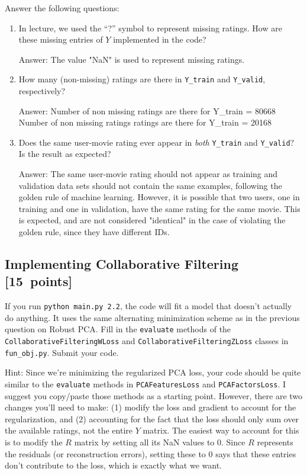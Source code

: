 \documentclass{article}
\newcommand{\blu}[1]{{\textcolor{blu}{#1}}}
\newcommand{\gre}[1]{\textcolor{gre}{#1}}
\newcommand\ans[1]{\par\gre{Answer: #1}}
\let\ask\blu
\newcommand\pts[1]{\textcolor{pointscolour}{[#1~points]}}
\begin{document}
\ask{Answer the following questions:}

\begin{enumerate}
\item In lecture, we used the ``?'' symbol to represent missing ratings. How are these missing entries of $Y$ implemented in the code?
\ans{The value "NaN" is used to represent missing ratings.}
\item How many (non-missing) ratings are there in \texttt{Y\_train} and \texttt{Y\_valid}, respectively?
\ans{\newline Number of non missing ratings are there for Y\_train = 80668 \newline Number of non missing ratings ratings are there for Y\_train = 20168}
\item Does the same user-movie rating ever appear in \emph{both} \texttt{Y\_train} and \texttt{Y\_valid}? Is the result as expected?
\ans{ The same user-movie rating should not appear as training and validation data sets should not contain the same examples, following the golden rule of machine learning. However, it is possible that two users, one in training and one in validation, have the same rating for the same movie. This is expected, and are not considered "identical" in the case of violating the golden rule, since they have different IDs.}
\end{enumerate}
\newpage

\subsection{Implementing Collaborative Filtering \pts{15}}

If you run \texttt{python main.py 2.2}, the code will fit a model that doesn't actually do anything. It uses the same alternating minimization scheme as in the previous question on Robust PCA. \ask{Fill in the \texttt{evaluate} methods of the \texttt{CollaborativeFilteringWLoss} and \texttt{CollaborativeFilteringZLoss} classes in \texttt{fun\_obj.py}. Submit your code.}

Hint: Since we're minimizing the regularized PCA loss, your code should be quite similar to the \texttt{evaluate} methods in \texttt{PCAFeaturesLoss} and \texttt{PCAFactorsLoss}. I suggest you copy/paste those methods as a starting point. However, there are two changes you'll need to make: (1) modify the loss and gradient to account for the regularization, and (2) accounting for the fact that the loss should only sum over the available ratings, not the entire $Y$ matrix. The easiest way to account for this is to modify the $R$ matrix by setting all its NaN values to 0. Since $R$ represents the residuals (or reconstruction errors), setting these to 0 says that these entries don't contribute to the loss, which is exactly what we want.
\end{document}
